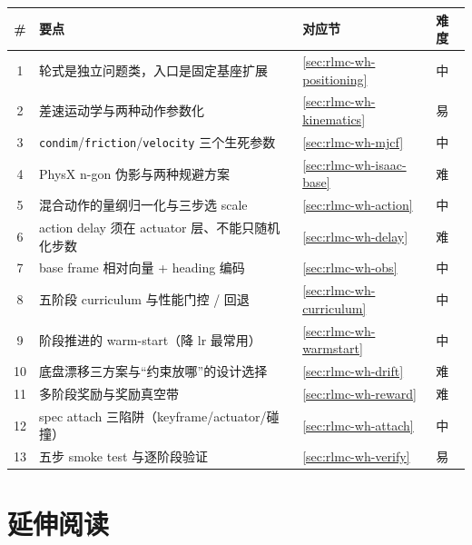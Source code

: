 \begin{center}
\small
\begin{tabular}{@{}clll@{}}
\toprule
\# & 要点 & 对应节 & 难度 \\
\midrule
1 & 轮式是独立问题类，入口是固定基座扩展 & \cref{sec:rlmc-wh-positioning} & 中 \\
2 & 差速运动学与两种动作参数化 & \cref{sec:rlmc-wh-kinematics} & 易 \\
3 & \verb|condim|/\verb|friction|/\verb|velocity| 三个生死参数 & \cref{sec:rlmc-wh-mjcf} & 中 \\
4 & PhysX n-gon 伪影与两种规避方案 & \cref{sec:rlmc-wh-isaac-base} & 难 \\
5 & 混合动作的量纲归一化与三步选 scale & \cref{sec:rlmc-wh-action} & 中 \\
6 & action delay 须在 actuator 层、不能只随机化步数 & \cref{sec:rlmc-wh-delay} & 难 \\
7 & base frame 相对向量 + heading 编码 & \cref{sec:rlmc-wh-obs} & 中 \\
8 & 五阶段 curriculum 与性能门控 / 回退 & \cref{sec:rlmc-wh-curriculum} & 中 \\
9 & 阶段推进的 warm-start（降 lr 最常用） & \cref{sec:rlmc-wh-warmstart} & 中 \\
10 & 底盘漂移三方案与“约束放哪”的设计选择 & \cref{sec:rlmc-wh-drift} & 难 \\
11 & 多阶段奖励与奖励真空带 & \cref{sec:rlmc-wh-reward} & 难 \\
12 & spec attach 三陷阱（keyframe/actuator/碰撞） & \cref{sec:rlmc-wh-attach} & 中 \\
13 & 五步 smoke test 与逐阶段验证 & \cref{sec:rlmc-wh-verify} & 易 \\
\bottomrule
\end{tabular}
\end{center}

\section{延伸阅读}
\label{sec:rlmc-wh-reading}

